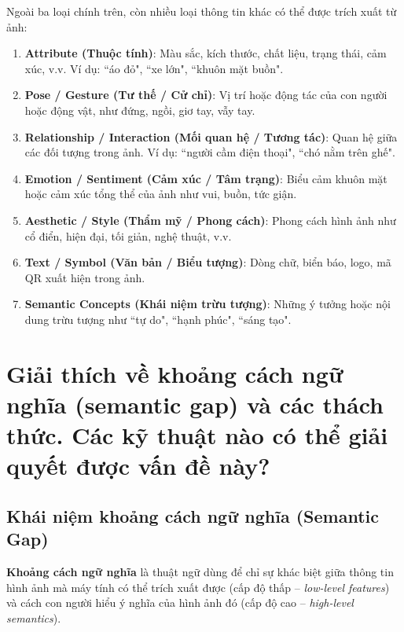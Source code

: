 \documentclass[12pt]{article}
\begin{document}
	Ngoài ba loại chính trên, còn nhiều loại thông tin khác có thể được trích xuất từ ảnh:
	
	\begin{enumerate}[label=\textbf{\arabic*.}]
	\item \textbf{Attribute (Thuộc tính)}: Màu sắc, kích thước, chất liệu, trạng thái, cảm xúc, v.v. Ví dụ: ``áo đỏ", ``xe lớn", ``khuôn mặt buồn".
	
	\item \textbf{Pose / Gesture (Tư thế / Cử chỉ)}: Vị trí hoặc động tác của con người hoặc động vật, như đứng, ngồi, giơ tay, vẫy tay.
	
	\item \textbf{Relationship / Interaction (Mối quan hệ / Tương tác)}: Quan hệ giữa các đối tượng trong ảnh. Ví dụ: ``người cầm điện thoại", ``chó nằm trên ghế".
	
	\item \textbf{Emotion / Sentiment (Cảm xúc / Tâm trạng)}: Biểu cảm khuôn mặt hoặc cảm xúc tổng thể của ảnh như vui, buồn, tức giận.
	
	\item \textbf{Aesthetic / Style (Thẩm mỹ / Phong cách)}: Phong cách hình ảnh như cổ điển, hiện đại, tối giản, nghệ thuật, v.v.
	
	\item \textbf{Text / Symbol (Văn bản / Biểu tượng)}: Dòng chữ, biển báo, logo, mã QR xuất hiện trong ảnh.
	
	\item \textbf{Semantic Concepts (Khái niệm trừu tượng)}: Những ý tưởng hoặc nội dung trừu tượng như ``tự do", ``hạnh phúc", ``sáng tạo".
	\end{enumerate}
	
	\section{Giải thích về khoảng cách ngữ nghĩa (semantic gap) và các thách thức. Các kỹ thuật nào có thể giải quyết được vấn đề này?}
	
	\subsection{Khái niệm khoảng cách ngữ nghĩa (Semantic Gap)}
	
	\textbf{Khoảng cách ngữ nghĩa} là thuật ngữ dùng để chỉ sự khác biệt giữa thông tin hình ảnh mà máy tính có thể trích xuất được (cấp độ thấp -- \textit{low-level features}) và cách con người hiểu ý nghĩa của hình ảnh đó (cấp độ cao -- \textit{high-level semantics}).
	
\end{document}
